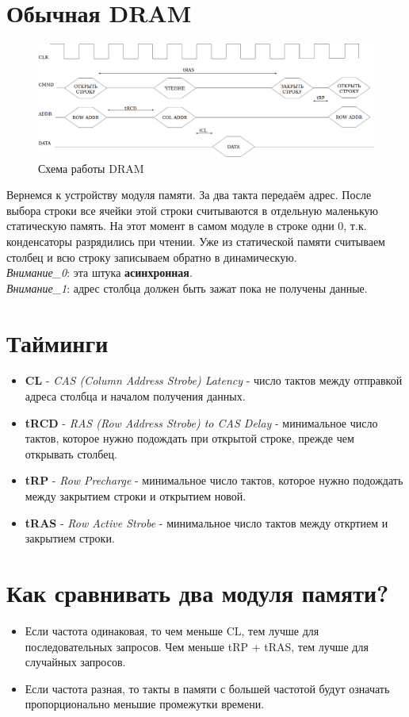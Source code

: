 \documentclass[12pt, a4paper]{article}
\begin{document}
\section{Обычная DRAM}
\begin{figure}[h]
    \centering
    \includegraphics[scale=0.2]{images/DRAM.png}
    \caption{Схема работы DRAM}
    \label{fig:DRAM}
\end{figure}
Вернемся к устройству модуля памяти. За два такта передаём адрес. После выбора строки все ячейки этой строки считываются в отдельную маленькую статическую память. На этот момент в самом модуле в строке одни $0$, т.к. конденсаторы разрядились при чтении. Уже из статической памяти считываем столбец и всю строку записываем обратно в динамическую.\\
\textit{Внимание\_0}: эта штука \textbf{асинхронная}.\\
\textit{Внимание\_1}: адрес столбца должен быть зажат пока не получены данные.
\section{Тайминги}
\begin{itemize}
    \item \textbf{CL} - \textit{CAS (Column Address Strobe) Latency} - число тактов между отправкой адреса столбца и началом получения данных.
    \item \textbf{tRCD} - \textit{RAS (Row Address Strobe) to CAS Delay} - минимальное число тактов, которое нужно подождать при открытой строке, прежде чем открывать столбец.
    \item \textbf{tRP} - \textit{Row Precharge} - минимальное число тактов, которое нужно подождать между закрытием строки и открытием новой.
    \item \textbf{tRAS} - \textit{Row Active Strobe} - минимальное число тактов между откртием и закрытием строки.
\end{itemize}
\section{Как сравнивать два модуля памяти?}
\begin{itemize}
    \item Если частота одинаковая, то чем меньше CL, тем лучше для последовательных запросов. Чем меньше tRP + tRAS, тем лучше для случайных запросов.
    \item Если частота разная, то такты в памяти с большей частотой будут означать пропорционально меньшие промежутки времени.
\end{itemize}
\end{document}
